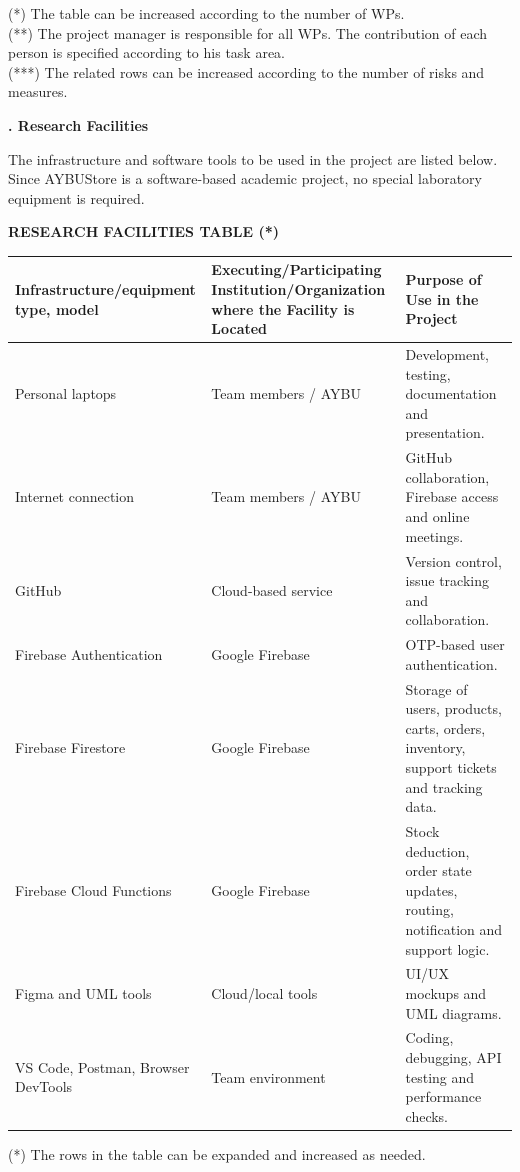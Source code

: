 \documentclass[10pt,a4paper]{article}
\newcommand{\subhead}[1]{\vspace{0.8em}\noindent\textbf{\fontsize{10}{11}\selectfont #1}\par\vspace{0.3em}}
\begin{document}
{\footnotesize
(*) The table can be increased according to the number of WPs. \\
(**) The project manager is responsible for all WPs. The contribution of each person is specified according to his task area. \\
(***) The related rows can be increased according to the number of risks and measures.
}

\subhead{3.2. Research Facilities}

The infrastructure and software tools to be used in the project are listed below. Since AYBUStore is a software-based academic project, no special laboratory equipment is required.

\begin{center}
\textbf{RESEARCH FACILITIES TABLE (*)}
\end{center}

\scriptsize
\begin{tabularx}{\textwidth}{|P{0.31\textwidth}|P{0.28\textwidth}|Y|}
\hline
\textbf{Infrastructure/equipment type, model} &
\textbf{Executing/Participating Institution/Organization where the Facility is Located} &
\textbf{Purpose of Use in the Project} \\ \hline
Personal laptops & Team members / AYBU & Development, testing, documentation and presentation. \\ \hline
Internet connection & Team members / AYBU & GitHub collaboration, Firebase access and online meetings. \\ \hline
GitHub & Cloud-based service & Version control, issue tracking and collaboration. \\ \hline
Firebase Authentication & Google Firebase & OTP-based user authentication. \\ \hline
Firebase Firestore & Google Firebase & Storage of users, products, carts, orders, inventory, support tickets and tracking data. \\ \hline
Firebase Cloud Functions & Google Firebase & Stock deduction, order state updates, routing, notification and support logic. \\ \hline
Figma and UML tools & Cloud/local tools & UI/UX mockups and UML diagrams. \\ \hline
VS Code, Postman, Browser DevTools & Team environment & Coding, debugging, API testing and performance checks. \\ \hline
\end{tabularx}

{\footnotesize
(*) The rows in the table can be expanded and increased as needed.
}
\normalsize
\end{document}
